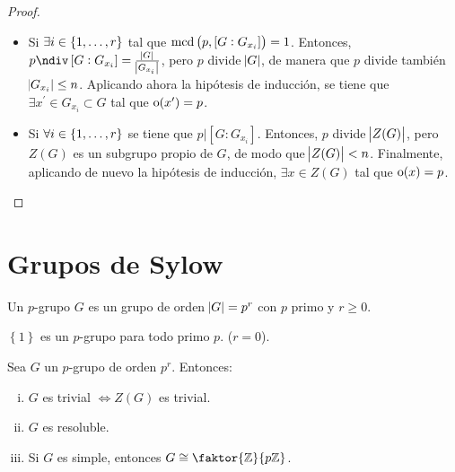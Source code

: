 \begin{proof}
    \begin{itemize}
        \item Si $\exists i\in\left\{ 1,\dots,r\right\}$ tal que $\operatorname{mcd}\left( p, \left[ G : G_{x_i} \right] \right) = 1$.
            Entonces, $p \ndiv \left[ G : G_{x_i} \right] = \frac{\abs{G}}{ \abs{G_{x_i}}}$, pero
            $p$ divide $\abs{G}$, de manera que $p$ divide también $\abs{G_{x_i}} \leq n$. Aplicando ahora la hipótesis de inducción,
            se tiene que $\exists x^{\prime} \in G_{x_i} \subset G$ tal que $\operatorname{o}(x^{\prime}) = p$.
        \item Si $\forall i\in\left\{ 1,\dots,r\right\}$ se tiene que $p \vert \left[ G : G_{x_i} \right]$. Entonces,
            $p$ divide $\abs{Z(G)}$, pero $Z(G)$ es un subgrupo propio de $G$, de modo que $\abs{Z(G)} < n$.
            Finalmente, aplicando de nuevo la hipótesis de inducción, $\exists x \in Z(G)$ tal que $\operatorname{o}(x) = p$.
    \end{itemize}
\end{proof}

\section{Grupos de Sylow}

\begin{defi}[$p$-grupo]
    Un $p$-grupo $G$ es un grupo de orden $\abs{G} = p^r$ con $p$ primo y $r \geq 0$.
\end{defi}

\begin{obs}
    $\left\{ 1 \right\}$ es un $p$-grupo para todo primo $p$. ($r = 0$).
\end{obs}

\begin{teo*}
    Sea $G$ un $p$-grupo de orden $p^r$. Entonces:
    \begin{enumerate}[i)]
        \item\label{item:pgrupo-1} $G$ es trivial $\iff Z(G)$ es trivial.
        \item\label{item:pgrupo-2} $G$ es resoluble.
        \item Si $G$ es simple, entonces $G \cong \faktor{\z}{p\z}$.
    \end{enumerate}
\end{teo*}

